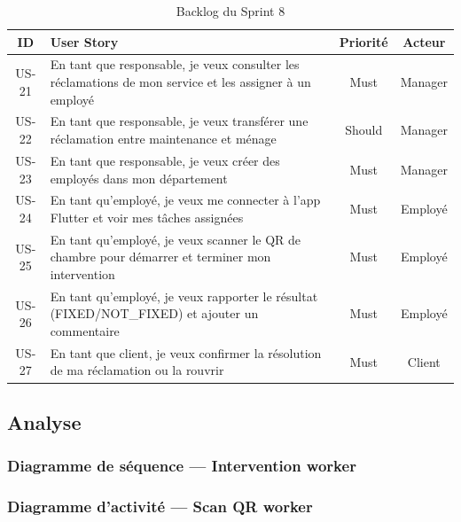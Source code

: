 \begin{table}[H]
\centering
\caption{Backlog du Sprint 8}
\label{tab:backlog_sprint8}
\begin{tabular}{|c|p{8.5cm}|c|c|}
\hline
\textbf{ID} & \textbf{User Story} & \textbf{Priorité} & \textbf{Acteur} \\
\hline
US-21 & En tant que responsable, je veux consulter les réclamations de mon service et les assigner à un employé & Must & Manager \\
\hline
US-22 & En tant que responsable, je veux transférer une réclamation entre maintenance et ménage & Should & Manager \\
\hline
US-23 & En tant que responsable, je veux créer des employés dans mon département & Must & Manager \\
\hline
US-24 & En tant qu'employé, je veux me connecter à l'app Flutter et voir mes tâches assignées & Must & Employé \\
\hline
US-25 & En tant qu'employé, je veux scanner le QR de chambre pour démarrer et terminer mon intervention & Must & Employé \\
\hline
US-26 & En tant qu'employé, je veux rapporter le résultat (FIXED/NOT\_FIXED) et ajouter un commentaire & Must & Employé \\
\hline
US-27 & En tant que client, je veux confirmer la résolution de ma réclamation ou la rouvrir & Must & Client \\
\hline
\end{tabular}
\end{table}

\subsection{Analyse}

\subsubsection{Diagramme de séquence — Intervention worker}


\subsubsection{Diagramme d'activité — Scan QR worker}


